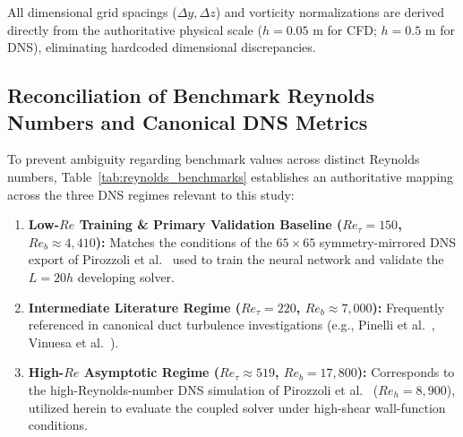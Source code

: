 \documentclass[11pt,a4paper]{article}
\begin{document}
All dimensional grid spacings ($\Delta y, \Delta z$) and vorticity normalizations are derived directly from the authoritative physical scale ($h = 0.05\text{ m}$ for CFD; $h = 0.5\text{ m}$ for DNS), eliminating hardcoded dimensional discrepancies.

\subsection{Reconciliation of Benchmark Reynolds Numbers and Canonical DNS Metrics}
\label{sec:reynolds_benchmarks}
To prevent ambiguity regarding benchmark values across distinct Reynolds numbers, Table~\ref{tab:reynolds_benchmarks} establishes an authoritative mapping across the three DNS regimes relevant to this study:
\begin{enumerate}
    \item \textbf{Low-$Re$ Training \& Primary Validation Baseline ($Re_\tau = 150$, $Re_b \approx 4{,}410$):} Matches the conditions of the $65 \times 65$ symmetry-mirrored DNS export of Pirozzoli et al.~\cite{pirozzoli2018turbulence} used to train the neural network and validate the $L = 20h$ developing solver.
    \item \textbf{Intermediate Literature Regime ($Re_\tau = 220$, $Re_b \approx 7{,}000$):} Frequently referenced in canonical duct turbulence investigations (e.g., Pinelli et al.~\cite{pinelli2010reynolds}, Vinuesa et al.~\cite{vinuesa2014aspect}).
    \item \textbf{High-$Re$ Asymptotic Regime ($Re_\tau \approx 519$, $Re_b = 17{,}800$):} Corresponds to the high-Reynolds-number DNS simulation of Pirozzoli et al.~\cite{pirozzoli2018turbulence} ($Re_h = 8{,}900$), utilized herein to evaluate the coupled solver under high-shear wall-function conditions.
\end{enumerate}

\begin{table}[htbp]
\centering
\small
\caption{Authoritative canonical benchmark DNS reference parameters and metrics across Reynolds numbers.}
\label{tab:reynolds_benchmarks}
\end{table}
\end{document}
